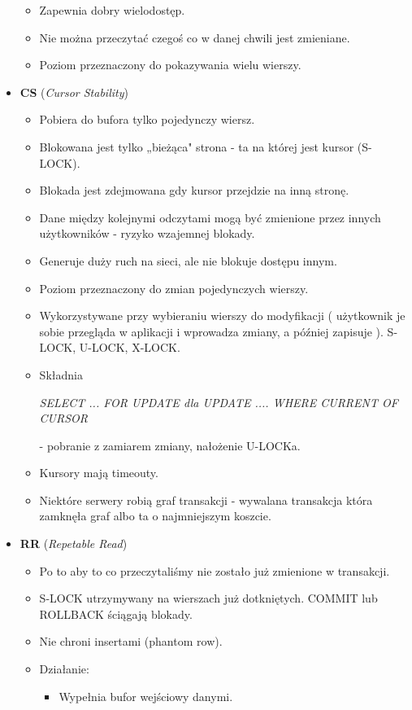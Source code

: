 \documentclass[a4paper,twoside]{article}
\begin{document}
\begin{itemize}
\begin{itemize}
  			\item Zapewnia dobry wielodostęp.
  			\item Nie można przeczytać czegoś co w danej chwili jest zmieniane.
  			\item Poziom przeznaczony do pokazywania wielu wierszy.
  		\end{itemize}
  		\item \textbf{CS} (\emph{Cursor Stability})
  		\begin{itemize}
  			\item Pobiera do bufora tylko pojedynczy wiersz.
  			\item Blokowana jest tylko „bieżąca" strona - ta na której jest kursor (S-LOCK).
  			\item Blokada jest zdejmowana gdy kursor przejdzie na inną stronę.
  			\item Dane między kolejnymi odczytami mogą być zmienione przez innych użytkowników - ryzyko wzajemnej blokady.
  			\item Generuje duży ruch na sieci, ale nie blokuje dostępu innym.
  			\item Poziom przeznaczony do zmian pojedynczych wierszy.
  			\item Wykorzystywane przy wybieraniu wierszy do modyfikacji ( użytkownik je sobie przegląda w aplikacji i wprowadza zmiany, a później zapisuje ). S-LOCK, U-LOCK, X-LOCK.
  			\item Składnia\\
  			\centerline{\emph{SELECT ... FOR UPDATE dla UPDATE .... WHERE CURRENT OF CURSOR}} - pobranie z zamiarem zmiany, nałożenie U-LOCKa.
  			\item Kursory mają timeouty.
  			\item Niektóre serwery robią graf transakcji - wywalana transakcja która zamknęła graf albo ta o najmniejszym koszcie.
  		\end{itemize}
  		\item \textbf{RR} (\emph{Repetable Read})
  		\begin{itemize}
  			\item Po to aby to co przeczytaliśmy nie zostało już zmienione w transakcji.
  			\item S-LOCK utrzymywany na wierszach już dotkniętych. COMMIT lub ROLLBACK ściągają blokady.
  			\item Nie chroni insertami (phantom row).
  			\item Działanie:
  			\begin{itemize}
  				\item Wypełnia bufor wejściowy danymi.

\end{itemize}
\end{itemize}
\end{itemize}
\end{document}
